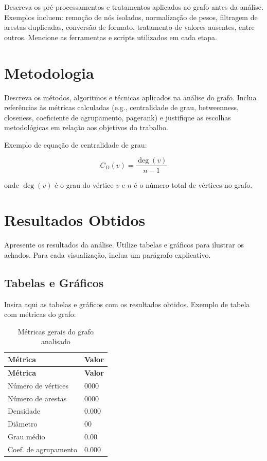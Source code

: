 \documentclass[sigconf]{webmedia}
\begin{document}
Descreva os pré-processamentos e tratamentos aplicados ao grafo antes da
análise. Exemplos incluem: remoção de nós isolados, normalização de
pesos, filtragem de arestas duplicadas, conversão de formato, tratamento
de valores ausentes, entre outros. Mencione as ferramentas e scripts
utilizados em cada etapa.

\section{Metodologia}\label{metodologia}

Descreva os métodos, algoritmos e técnicas aplicados na análise do
grafo. Inclua referências às métricas calculadas (e.g., centralidade de
grau, betweenness, closeness, coeficiente de agrupamento, pagerank) e
justifique as escolhas metodológicas em relação aos objetivos do
trabalho.

Exemplo de equação de centralidade de grau:

\[
C_D(v) = \frac{\deg(v)}{n - 1}
\]

onde \(\deg(v)\) é o grau do vértice \(v\) e \(n\) é o número total de
vértices no grafo.

\section{Resultados Obtidos}\label{resultados-obtidos}

Apresente os resultados da análise. Utilize tabelas e gráficos para
ilustrar os achados. Para cada visualização, inclua um parágrafo
explicativo.

\subsection{Tabelas e Gráficos}\label{tabelas-e-gruxe1ficos}

Insira aqui as tabelas e gráficos com os resultados obtidos. Exemplo de
tabela com métricas do grafo:

\begin{longtable}[]{@{}ll@{}}
\caption{Métricas gerais do grafo
analisado}\label{tbl-metricas}\tabularnewline
\toprule\noalign{}
\textbf{Métrica} & \textbf{Valor} \\
\midrule\noalign{}
\endfirsthead
\toprule\noalign{}
\textbf{Métrica} & \textbf{Valor} \\
\midrule\noalign{}
\endhead
\bottomrule\noalign{}
\endlastfoot
Número de vértices & 0000 \\
Número de arestas & 0000 \\
Densidade & 0.000 \\
Diâmetro & 00 \\
Grau médio & 0.00 \\
Coef. de agrupamento & 0.000 \\
\end{longtable}
\end{document}
